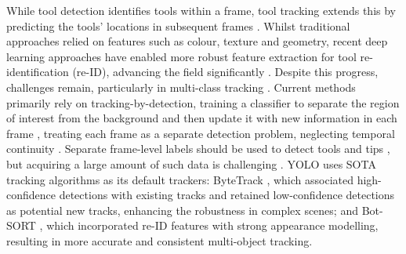 While tool detection identifies tools within a frame, tool tracking extends this by predicting the tools' locations in subsequent frames \cite{SurgiTrack}. Whilst traditional approaches relied on features such as colour, texture and geometry, recent deep learning approaches have enabled more robust feature extraction for tool re-identification (re-ID), advancing the field significantly \cite{bouget_vision-based_2017, SurgiTrack}. Despite this progress, challenges remain, particularly in multi-class tracking \cite{nwoye_2019, nwoye:tel-03855189}. Current methods primarily rely on tracking-by-detection, training a classifier to separate the region of interest from the background and then update it with new information in each frame \cite{ali2023comprehensivesurveyrecentdeep}, treating each frame as a separate detection problem, neglecting temporal continuity \cite{paley_crowdsourced_2021}. Separate frame-level labels should be used to detect tools and tips \cite{ali2023comprehensivesurveyrecentdeep}, but acquiring a large amount of such data is challenging \cite{bodenstedt_comparative_2018}. YOLO uses SOTA tracking algorithms as its default trackers: ByteTrack \cite{ByteTrack}, which associated high-confidence detections with existing tracks and retained low-confidence detections as potential new tracks, enhancing the robustness in complex scenes; and Bot-SORT \cite{BoT-SORT}, which incorporated re-ID features with strong appearance modelling, resulting in more accurate and consistent multi-object tracking.
